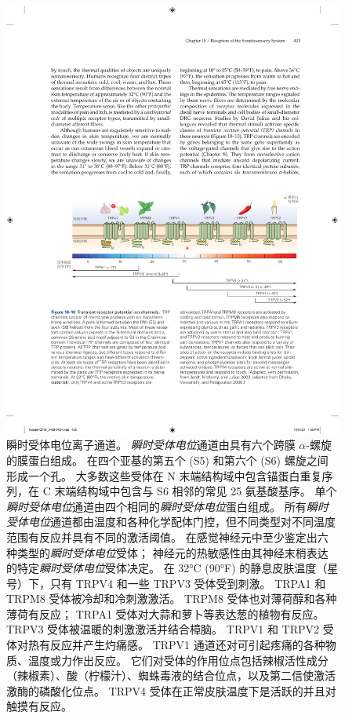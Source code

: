 \begin{figure}[htbp]
	\centering
	\includegraphics[width=1.0\linewidth]{chap18/fig_18_10}
	\caption{瞬时受体电位离子通道。
		\textit{瞬时受体电位}通道由具有六个跨膜 $\alpha$-螺旋的膜蛋白组成。
		在四个亚基的第五个 (S5) 和第六个 (S6) 螺旋之间形成一个孔。
		大多数这些受体在 N 末端结构域中包含锚蛋白重复序列，在 C 末端结构域中包含与 S6 相邻的常见 25 氨基酸基序。
		单个\textit{瞬时受体电位}通道由四个相同的\textit{瞬时受体电位}蛋白组成。
		所有\textit{瞬时受体电位}通道都由温度和各种化学配体门控，但不同类型对不同温度范围有反应并具有不同的激活阈值。
		在感觉神经元中至少鉴定出六种类型的\textit{瞬时受体电位}受体； 神经元的热敏感性由其神经末梢表达的特定\textit{瞬时受体电位}受体决定。
		在 32°C (90°F) 的静息皮肤温度（星号）下，只有 TRPV4 和一些 TRPV3 受体受到刺激。
		TRPA1 和 TRPM8 受体被冷却和冷刺激激活。
		TRPM8 受体也对薄荷醇和各种薄荷有反应； TRPA1 受体对大蒜和萝卜等表达葱的植物有反应。
		TRPV3 受体被温暖的刺激激活并结合樟脑。
		TRPV1 和 TRPV2 受体对热有反应并产生灼痛感。 
		TRPV1 通道还对可引起疼痛的各种物质、温度或力作出反应。
		它们对受体的作用位点包括辣椒活性成分（辣椒素）、酸（柠檬汁）、蜘蛛毒液的结合位点，以及第二信使激活激酶的磷酸化位点。
		TRPV4 受体在正常皮肤温度下是活跃的并且对触摸有反应\cite{jordt2003lessons}。}
	\label{fig:18_10}
\end{figure}


